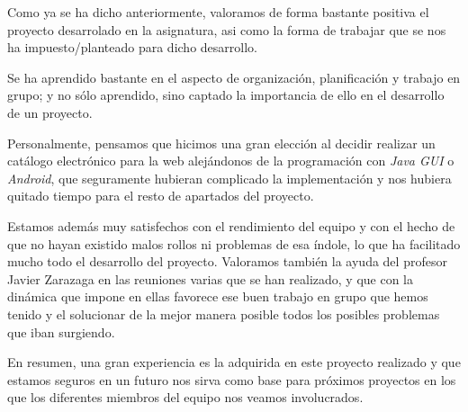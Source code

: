 Como ya se ha dicho anteriormente, valoramos de forma bastante positiva el proyecto desarrolado en la asignatura, asi como la forma de trabajar que se nos ha impuesto/planteado para dicho desarrollo.

Se ha aprendido bastante en el aspecto de organización, planificación y trabajo en grupo; y no sólo aprendido, sino captado la importancia de ello en el desarrollo de un proyecto.

Personalmente, pensamos que hicimos una gran elección al decidir realizar un catálogo electrónico para la web alejándonos de la programación con \textit{Java GUI} o \textit{Android}, que seguramente hubieran complicado la implementación y nos hubiera quitado tiempo para el resto de apartados del proyecto.

Estamos además muy satisfechos con el rendimiento del equipo y con el hecho de que no hayan existido malos rollos ni problemas de esa índole, lo que ha facilitado mucho todo el desarrollo del proyecto. Valoramos también la ayuda del profesor Javier Zarazaga en las reuniones varias que se han realizado, y que con la dinámica que impone en ellas favorece ese buen trabajo en grupo que hemos tenido y el solucionar de la mejor manera posible todos los posibles problemas que iban surgiendo.

En resumen, una gran experiencia es la adquirida en este proyecto realizado y que estamos seguros en un futuro nos sirva como base para próximos proyectos en los que los diferentes miembros del equipo nos veamos involucrados.